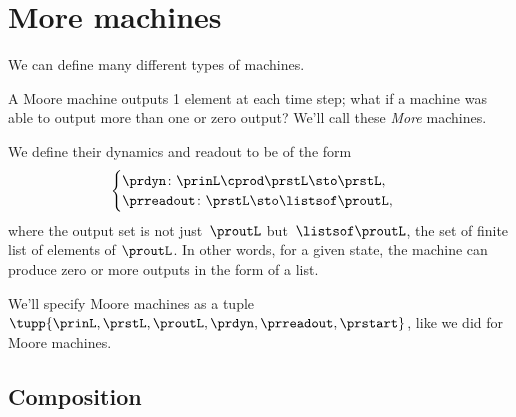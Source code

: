 
\section{More machines}
\label{sec:more-machines}

We can define many different types of machines.

A Moore machine outputs 1 element at each time step; what if a machine was able to output more than one or zero output?
We'll call these \emph{More} machines.

We define their dynamics and readout to be of the form
%
\begin{equation}
    \label{eq:more-signature}
    \begin{cases}
        \prdyn \colon  \prinL \cprod \prstL \sto \prstL, \\
        \prreadout \colon \prstL  \sto \listsof \proutL,
    \end{cases}
\end{equation}
%
where the output set is not just~$\proutL$ but~$\listsof \proutL$, the set of finite list of elements of $\proutL$.
In other words, for a given state, the machine can produce zero or more outputs in the form of a list.

We'll specify Moore machines as a tuple $\tupp{\prinL,\prstL,\proutL,\prdyn,\prreadout,\prstart}$, like we did for Moore machines.

\subsection{Composition}

